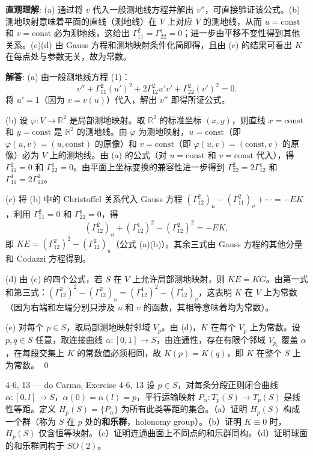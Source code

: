 \begin{solution}
\textbf{直观理解}: (a) 通过将 $v$ 代入一般测地线方程并解出 $v''$，可直接验证该公式。(b) 测地映射意味着平面的直线（测地线）在 $V$ 上对应 $V$ 的测地线，从而 $u=\mathrm{const}$ 和 $v=\mathrm{const}$ 必为测地线，这给出 $\Gamma_{11}^2=\Gamma_{22}^1=0$；进一步由平移不变性得到其他关系。(c)(d) 由 Gauss 方程和测地映射条件化简即得，且由 (c) 的结果可看出 $K$ 在每点处与参数无关，故为常数。

\textbf{解答}: (a) 由一般测地线方程 (1)：
\[
v'' + \Gamma_{11}^2(u')^2 + 2\Gamma_{12}^2 u'v' + \Gamma_{22}^2(v')^2 = 0.
\]
将 $u' = 1$（因为 $v=v(u)$）代入，解出 $v''$ 即得所证公式。

(b) 设 $\varphi: V \to \mathbb{R}^2$ 是局部测地映射。取 $\mathbb{R}^2$ 的标准坐标 $(x,y)$，则直线 $x=\mathrm{const}$ 和 $y=\mathrm{const}$ 是 $\mathbb{R}^2$ 的测地线。由 $\varphi$ 为测地映射，$u=\mathrm{const}$（即 $\varphi(u,v) = (u,\mathrm{const})$ 的原像）和 $v=\mathrm{const}$（即 $\varphi(u,v) = (\mathrm{const},v)$ 的原像）必为 $V$ 上的测地线。由 (a) 的公式（对 $u=\mathrm{const}$ 和 $v=\mathrm{const}$ 代入），得 $\Gamma_{11}^2=0$ 和 $\Gamma_{22}^1=0$。由平面上坐标变换的兼容性进一步得到 $\Gamma_{22}^2 = 2\Gamma_{12}^1$ 和 $\Gamma_{11}^1 = 2\Gamma_{12}^2$。

(c) 将 (b) 中的 Christoffel 关系代入 Gauss 方程 $(\Gamma_{12}^2)_u - (\Gamma_{11}^2)_v + \cdots = -EK$，利用 $\Gamma_{11}^2 = 0$ 和 $\Gamma_{22}^1 = 0$，得
\[
(\Gamma_{12}^2)_u + (\Gamma_{12}^1)^2 - (\Gamma_{12}^2)^2 = -EK,
\]
即 $KE = (\Gamma_{12}^2)^2 - (\Gamma_{12}^2)_u$（公式 (a)(b)）。其余三式由 Gauss 方程的其他分量和 Codazzi 方程得到。

(d) 由 (c) 的四个公式，若 $S$ 在 $V$ 上允许局部测地映射，则 $KE = KG$。由第一式和第三式：$(\Gamma_{12}^2)^2 - (\Gamma_{12}^2)_u = (\Gamma_{12}^1)^2 - (\Gamma_{12}^1)_v$，这表明 $K$ 在 $V$ 上为常数（因为右端和左端分别只涉及 $u$ 和 $v$ 的函数，其相等意味着均为常数）。

(e) 对每个 $p \in S$，取局部测地映射邻域 $V_p$。由 (d)，$K$ 在每个 $V_p$ 上为常数。设 $p,q \in S$ 任意，取连接曲线 $\alpha:[0,1]\to S$，由连通性，存在有限个邻域 $V_{p_i}$ 覆盖 $\alpha$，在每段交集上 $K$ 的常数值必须相同，故 $K(p) = K(q)$，即 $K$ 在整个 $S$ 上为常数。
\qed
\end{solution}

\begin{exercise}{4-6, 13 — do Carmo, Exercise 4-6, 13}
设 $p \in S$，对每条分段正则闭合曲线 $\alpha: [0,l] \to S$，$\alpha(0)=\alpha(l)=p$，平行运输映射 $P_\alpha: T_p(S) \to T_p(S)$ 是线性等距。定义 $H_p(S) = \{P_\alpha\}$ 为所有此类等距的集合。（a）证明 $H_p(S)$ 构成一个群（称为 $S$ 在 $p$ 处的\textbf{和乐群}，holonomy group）。（b）证明 $K\equiv 0$ 时，$H_p(S)$ 仅含恒等映射。（c）证明连通曲面上不同点的和乐群同构。（d）证明球面的和乐群同构于 $SO(2)$。
\end{exercise}

